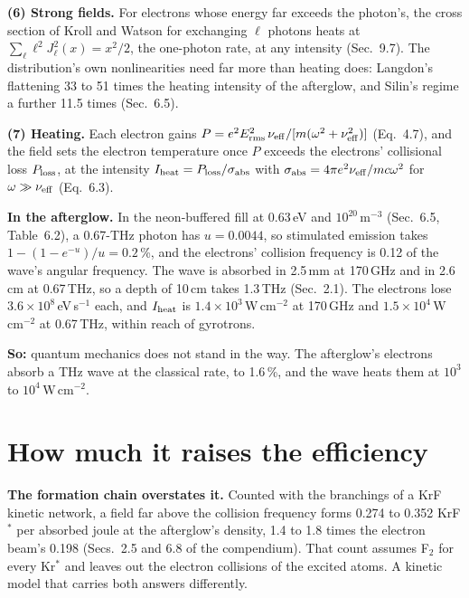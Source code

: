 \documentclass[11pt]{article}
\newcommand{\Krs}{Kr\ensuremath{^*}}
\newcommand{\Ft}{F\ensuremath{_2}}
\newcommand{\KrF}{KrF\ensuremath{^*}}
\begin{document}
\textbf{(6) Strong fields.} For electrons whose energy far exceeds the photon's, the cross
section of Kroll and Watson \cite{KrollWatson1973} for exchanging $\ell$ photons heats at
$\sum_\ell\ell^2J_\ell^2(x)=x^2/2$, the one-photon rate, at any intensity (Sec.~9.7). The
distribution's own nonlinearities need far more than heating does: Langdon's flattening
\cite{Langdon1980} 33 to 51 times the heating intensity of the afterglow, and Silin's regime a
further 11.5 times (Sec.~6.5).

\textbf{(7) Heating.} Each electron gains $P=e^2E_{\rm rms}^2\,\nu_{\rm eff}/[m(\omega^2+\nu_{\rm eff}^2)]$
(Eq.~4.7), and the field sets the electron temperature once $P$ exceeds the electrons'
collisional loss $P_{\rm loss}$, at the intensity $I_{\rm heat}=P_{\rm loss}/\sigma_{\rm abs}$ with
$\sigma_{\rm abs}=4\pi e^2\nu_{\rm eff}/mc\omega^2$ for $\omega\gg\nu_{\rm eff}$ (Eq.~6.3).

\textbf{In the afterglow.} In the neon-buffered fill at 0.63\,eV and $10^{20}$\,m$^{-3}$ (Sec.~6.5,
Table~6.2), a 0.67-THz photon has $u=0.0044$, so stimulated emission takes $1-(1-e^{-u})/u=0.2$\,\%,
and the electrons' collision frequency is 0.12 of the wave's angular frequency. The wave is
absorbed in 2.5\,mm at 170\,GHz and in 2.6\,cm at 0.67\,THz, so a depth of 10\,cm takes 1.3\,THz
(Sec.~2.1). The electrons lose $3.6\times10^{8}$\,eV\,s$^{-1}$ each, and $I_{\rm heat}$ is
$1.4\times10^{3}$\,W\,cm$^{-2}$ at 170\,GHz and $1.5\times10^{4}$\,W\,cm$^{-2}$ at 0.67\,THz, within
reach of gyrotrons.

\textbf{So:} quantum mechanics does not stand in the way. The afterglow's electrons absorb a THz
wave at the classical rate, to 1.6\,\%, and the wave heats them at $10^3$ to $10^4$\,W\,cm$^{-2}$.

\section{How much it raises the efficiency}
\label{sec:efficiency}
\textbf{The formation chain overstates it.} Counted with the branchings of a KrF kinetic
network, a field far above the collision frequency forms 0.274 to 0.352 \KrF{} per absorbed
joule at the afterglow's density, 1.4 to 1.8 times the electron beam's 0.198 (Secs.~2.5 and 6.8
of the compendium). That count assumes \Ft{} for every \Krs{} and leaves out the electron
collisions of the excited atoms. A kinetic model that carries both answers differently.
\end{document}
